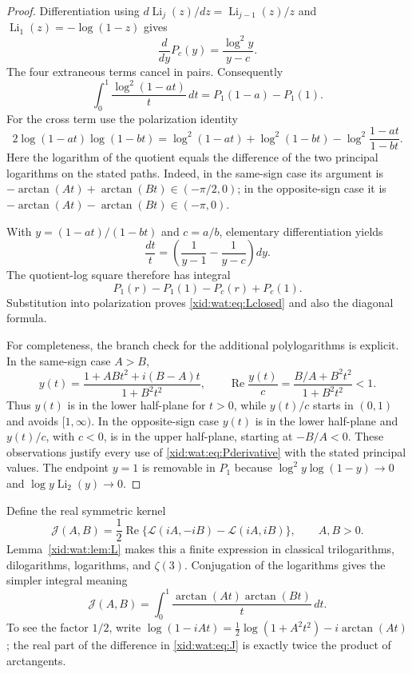 \begin{proof}
Differentiation using
$d\operatorname{Li}_j(z)/dz=\operatorname{Li}_{j-1}(z)/z$ and
$\operatorname{Li}_1(z)=-\log(1-z)$ gives
\begin{equation}\label{xid:wat:eq:Pderivative}
 \frac{d}{dy}P_c(y)=\frac{\log^2y}{y-c}.
\end{equation}
The four extraneous terms cancel in pairs. Consequently
\[
 \int_0^1\frac{\log^2(1-at)}t\,dt
 =P_1(1-a)-P_1(1).
\]
For the cross term use the polarization identity
\[
 2\log(1-at)\log(1-bt)
 =\log^2(1-at)+\log^2(1-bt)
  -\log^2\frac{1-at}{1-bt}.
\]
Here the logarithm of the quotient equals the difference of the two
principal logarithms on the stated paths. Indeed, in the same-sign
case its argument is $-\arctan(At)+\arctan(Bt)\in(-\pi/2,0)$;
in the opposite-sign case it is
$-\arctan(At)-\arctan(Bt)\in(-\pi,0)$.

With $y=(1-at)/(1-bt)$ and $c=a/b$, elementary differentiation yields
\[
 \frac{dt}{t}=\left(\frac1{y-1}-\frac1{y-c}\right)dy.
\]
The quotient-log square therefore has integral
\[
 P_1(r)-P_1(1)-P_c(r)+P_c(1).
\]
Substitution into polarization proves \eqref{xid:wat:eq:Lclosed} and also
the diagonal formula.

For completeness, the branch check for the additional polylogarithms
is explicit. In the same-sign case $A>B$,
\[
 y(t)=\frac{1+ABt^2+i(B-A)t}{1+B^2t^2},
 \qquad
 \operatorname{Re}\frac{y(t)}c
 =\frac{B/A+B^2t^2}{1+B^2t^2}<1.
\]
Thus $y(t)$ is in the lower half-plane for $t>0$, while $y(t)/c$
starts in $(0,1)$ and avoids $[1,\infty)$.
In the opposite-sign case $y(t)$ is in the lower half-plane and
$y(t)/c$, with $c<0$, is in the upper half-plane, starting at
$-B/A<0$. These observations justify every use of
\eqref{xid:wat:eq:Pderivative} with the stated principal values. The
endpoint $y=1$ is removable in $P_1$ because
$\log^2y\log(1-y)\to0$ and
$\log y\operatorname{Li}_2(y)\to0$.
\end{proof}

Define the real symmetric kernel
\begin{equation}\label{xid:wat:eq:J}
 \mathcal J(A,B)=\frac12\operatorname{Re}
       \{\mathcal L(iA,-iB)-\mathcal L(iA,iB)\},
 \qquad A,B>0.
\end{equation}
Lemma~\ref{xid:wat:lem:L} makes this a finite expression in classical
trilogarithms, dilogarithms, logarithms, and $\zeta(3)$.
Conjugation of the logarithms gives the simpler integral meaning
\begin{equation}\label{xid:wat:eq:Jintegral}
 \mathcal J(A,B)=\int_0^1
              \frac{\arctan(At)\arctan(Bt)}t\,dt.
\end{equation}
To see the factor $1/2$, write
$\log(1-iAt)=\frac12\log(1+A^2t^2)-i\arctan(At)$;
the real part of the difference in \eqref{xid:wat:eq:J} is exactly twice
the product of arctangents.

